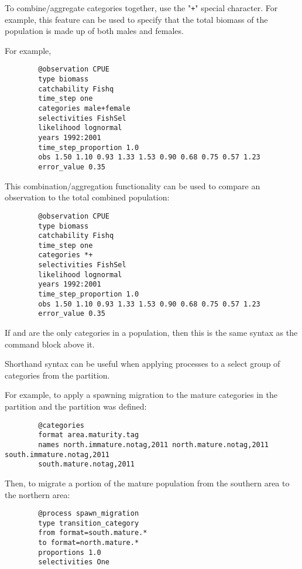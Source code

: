 To combine/aggregate categories together, use the "\texttt{+}" special character. For example, this feature can be used to specify that the total biomass of the population is made up of both males and females.

For example,

{\small{\begin{verbatim}
		@observation CPUE
		type biomass
		catchability Fishq
		time_step one
		categories male+female
		selectivities FishSel
		likelihood lognormal
		years 1992:2001
		time_step_proportion 1.0
		obs 1.50 1.10 0.93 1.33 1.53 0.90 0.68 0.75 0.57 1.23
		error_value 0.35
		\end{verbatim}}}

This combination/aggregation functionality can be used to compare an observation to the total combined population:

{\small{\begin{verbatim}
		@observation CPUE
		type biomass
		catchability Fishq
		time_step one
		categories *+
		selectivities FishSel
		likelihood lognormal
		years 1992:2001
		time_step_proportion 1.0
		obs 1.50 1.10 0.93 1.33 1.53 0.90 0.68 0.75 0.57 1.23
		error_value 0.35
		\end{verbatim}}}

If  and  are the only categories in a population, then this is the same syntax as the command block above it.

Shorthand syntax can be useful when applying processes to a select group of categories from the partition.

For example, to apply a spawning migration to the mature categories in the partition and the partition was defined:

{\small{\begin{verbatim}
		@categories
		format area.maturity.tag
		names north.immature.notag,2011 north.mature.notag,2011 south.immature.notag,2011
		south.mature.notag,2011
		\end{verbatim}}}

Then, to migrate a portion of the mature population from the southern area to the northern area:

{\small{\begin{verbatim}
		@process spawn_migration
		type transition_category
		from format=south.mature.*
		to format=north.mature.*
		proportions 1.0
		selectivities One
		\end{verbatim}}}


\paragraph*{\label{sec:params}}

